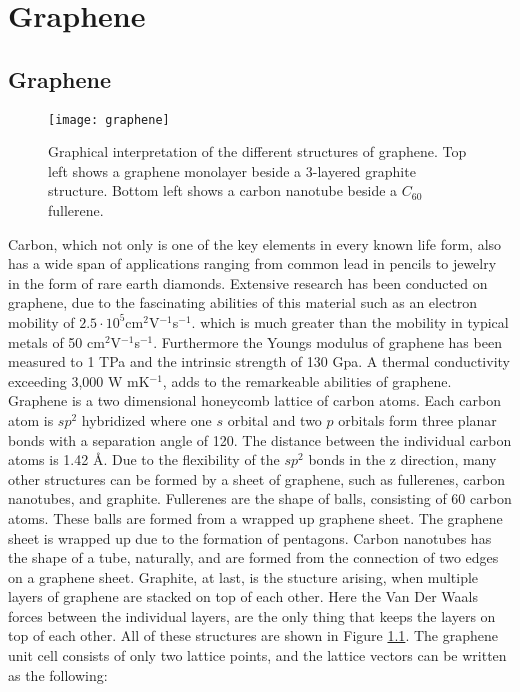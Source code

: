 \chapter{Graphene}
\label{theory}

\section{Graphene}


\begin{wrapfigure}{r}{0.38\textwidth}
  \centering
  \texttt{[image: graphene]}
  \caption{Graphical interpretation of the different structures of graphene. Top left shows a graphene monolayer beside a 3-layered graphite structure. Bottom left shows a carbon nanotube beside a $C_{60}$ fullerene.}
  \label{graphene}
\end{wrapfigure}

Carbon, which not only is one of the key elements in every known life form, also has a wide span of applications ranging from common lead in pencils to jewelry in the form of rare earth diamonds. Extensive research has been conducted on graphene, due to the fascinating abilities of this material such as an electron mobility of $2.5 \cdot 10^5$cm$^2$V$^{-1}$s$^{-1}$.\cite{grapheneroad} which is much greater than the mobility in typical metals of 50 cm$^2$V$^{-1}$s$^{-1}$.\cite{mobilitybog} Furthermore the Youngs modulus of graphene has been measured to 1 TPa and the intrinsic strength of 130 Gpa.\cite{grapheneroad} A thermal conductivity exceeding 3,000 W mK$^{-1}$, adds to the remarkeable abilities of graphene.\\

Graphene is a two dimensional honeycomb lattice of carbon atoms. Each carbon atom is $sp^2$ hybridized where one $s$ orbital and two $p$ orbitals form three planar bonds with a separation angle of 120\degree.\cite{RevModPhys.81.109} The distance between the individual carbon atoms is 1.42 Å. Due to the flexibility of the $sp^2$ bonds in the z direction, many other structures can be formed by a sheet of graphene, such as fullerenes, carbon nanotubes, and graphite. Fullerenes are the shape of balls, consisting of 60 carbon atoms. These balls are formed from a wrapped up graphene sheet. The graphene sheet is wrapped up due to the formation of pentagons. Carbon nanotubes has the shape of a tube, naturally, and are formed from the connection of two edges on a graphene sheet. Graphite, at last, is the stucture arising, when multiple layers of graphene are stacked on top of each other. Here the Van Der Waals forces between the individual layers, are the only thing that keeps the layers on top of each other. All of these structures are shown in Figure \ref{graphene}. The graphene unit cell consists of only two lattice points, and the lattice vectors can be written as the following:

